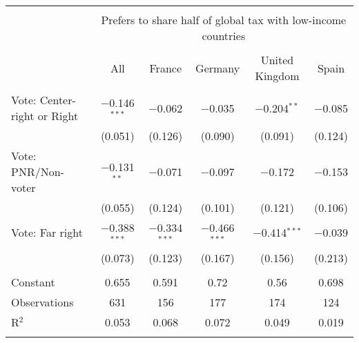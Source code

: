 
\begin{tabular}{@{\extracolsep{5pt}}lccccc} 
\\[-1.8ex]\hline 
\hline \\[-1.8ex] 
 & \multicolumn{5}{c}{Prefers to share half of global tax with low-income countries} \\ 
\cline{2-6} 
\\[-1.8ex] & All & France & Germany & United Kingdom & Spain \\ 
\hline \\[-1.8ex] 
 Vote: Center-right or Right & $-$0.146$^{***}$ & $-$0.062 & $-$0.035 & $-$0.204$^{**}$ & $-$0.085 \\ 
  & (0.051) & (0.126) & (0.090) & (0.091) & (0.124) \\ 
  Vote: PNR/Non-voter & $-$0.131$^{**}$ & $-$0.071 & $-$0.097 & $-$0.172 & $-$0.153 \\ 
  & (0.055) & (0.124) & (0.101) & (0.121) & (0.106) \\ 
  Vote: Far right & $-$0.388$^{***}$ & $-$0.334$^{***}$ & $-$0.466$^{***}$ & $-$0.414$^{***}$ & $-$0.039 \\ 
  & (0.073) & (0.123) & (0.167) & (0.156) & (0.213) \\ 
 \hline \\[-1.8ex] 
Constant & 0.655 & 0.591 & 0.72 & 0.56 & 0.698 \\ 
Observations & 631 & 156 & 177 & 174 & 124 \\ 
R$^{2}$ & 0.053 & 0.068 & 0.072 & 0.049 & 0.019 \\ 
\hline 
\hline \\[-1.8ex] 
\end{tabular} 